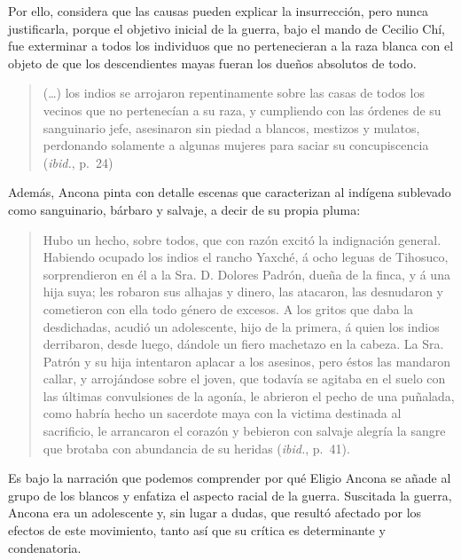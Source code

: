 Por ello, considera que las causas pueden explicar la insurrección, pero
nunca justificarla,  porque el objetivo inicial  de la guerra, bajo el
mando de Cecilio Chí, fue exterminar a todos los individuos que no
pertenecieran a la raza blanca con el objeto de que los descendientes mayas
fueran los dueños absolutos de todo.  


\begin{quotation}
(\ldots) los indios  se arrojaron repentinamente sobre las casas de todos los
vecinos que no pertenecían a su raza, y cumpliendo con las órdenes de su
sanguinario jefe, asesinaron sin piedad a blancos, mestizos y mulatos,
perdonando solamente a algunas mujeres para saciar su concupiscencia
(\textit{ibid.}, p.~24)
\end{quotation}

Además, Ancona pinta con detalle escenas que caracterizan al indígena
sublevado como sanguinario, bárbaro y salvaje, a decir de su propia pluma:
\enlargethispage{1\baselineskip}


\begin{quotation}
Hubo un hecho, sobre todos, que con razón excitó la indignación general.
Habiendo ocupado los indios el rancho Yaxché, á ocho leguas de Tihosuco,
sorprendieron en él a la Sra. D. Dolores Padrón, dueña de la finca, y á una
hija suya; les robaron sus alhajas y dinero, las atacaron, las desnudaron y
cometieron con ella todo género de excesos. A los gritos que daba la
desdichadas, acudió un adolescente, hijo de la primera, á quien los indios
derribaron, desde luego, dándole un fiero machetazo en la  cabeza. La Sra.
Patrón y su hija intentaron aplacar a los asesinos, pero éstos las mandaron
 callar, y arrojándose sobre el  joven, que todavía se agitaba en el suelo
con las últimas convulsiones de la agonía, le abrieron el pecho de una
puñalada, como habría hecho un sacerdote maya con la victima destinada al
sacrificio, le arrancaron el corazón y bebieron con salvaje alegría la
sangre que brotaba con abundancia de su heridas (\textit{ibid.}, p.~41).
\end{quotation}

Es  bajo la narración que podemos comprender por qué Eligio Ancona se añade
al grupo de los blancos y enfatiza el aspecto racial de la guerra.
Suscitada la guerra, Ancona era un adolescente y, sin lugar a dudas, que
resultó afectado por los efectos de este movimiento, tanto así que su
crítica es determinante y condenatoria.

